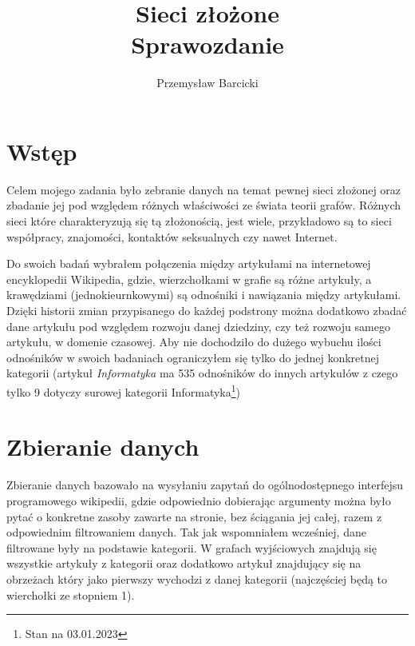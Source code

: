 \documentclass[a4paper, 12pt]{article}
\begin{document}
\title{
    \huge{Sieci złożone} \\
    \small{Sprawozdanie}
}
\author{Przemysław Barcicki}
\maketitle

\thispagestyle{empty}

\section{Wstęp}
Celem mojego zadania było zebranie danych na temat pewnej sieci złożonej oraz zbadanie jej pod względem różnych właściwości ze świata teorii grafów. Różnych sieci które charakteryzują się tą złożonością, jest wiele, przykładowo są to sieci współpracy, znajomości, kontaktów seksualnych czy nawet Internet.

Do swoich badań wybrałem połączenia między artykułami na internetowej encyklopedii Wikipedia, gdzie, wierzchołkami w grafie są różne artykuły, a krawędziami (jednokieurnkowymi) są odnośniki i nawiązania między artykułami. Dzięki historii zmian przypisanego do każdej podstrony można dodatkowo zbadać dane artykułu pod względem rozwoju danej dziedziny, czy też rozwoju samego artykułu, w domenie czasowej. Aby nie dochodziło do dużego wybuchu ilości odnośników w swoich badaniach ograniczyłem się tylko do jednej konkretnej kategorii (artykuł \textit{Informatyka} ma 535 odnośników do innych artykułów z czego tylko 9 dotyczy surowej kategorii Informatyka\footnote{Stan na 03.01.2023})

\section{Zbieranie danych}
Zbieranie danych bazowało na wysyłaniu zapytań do ogólnodostępnego interfejsu programowego wikipedii, gdzie odpowiednio dobierając argumenty można było pytać o konkretne zasoby zawarte na stronie, bez ściągania jej całej, razem z odpowiednim filtrowaniem danych. Tak jak wspomniałem wcześniej, dane filtrowane były na podstawie kategorii. W grafach wyjściowych znajdują się wszystkie artykuły z kategorii oraz dodatkowo artykuł znajdujący się na obrzeżach który jako pierwszy wychodzi z danej kategorii (najczęściej będą to wierchołki ze stopniem 1).
\end{document}
